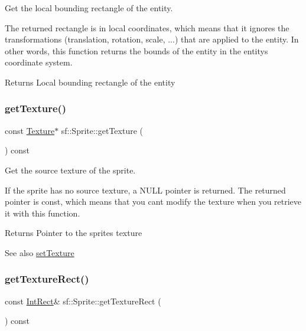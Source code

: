 Get the local bounding rectangle of the entity. 

The returned rectangle is in local coordinates, which means that it ignores the transformations (translation, rotation, scale, ...) that are applied to the entity. In other words, this function returns the bounds of the entity in the entity\textquotesingle{}s coordinate system.

\begin{DoxyReturn}{Returns}
Local bounding rectangle of the entity 
\end{DoxyReturn}
\mbox{\label{classsf_1_1_sprite_a1a76155146c8ff37c4eb5a306b4e9ebe}} 
\subsubsection{\texorpdfstring{get\+Texture()}{getTexture()}}
{\footnotesize\ttfamily const \hyperlink{classsf_1_1_texture}{Texture}$\ast$ sf\+::\+Sprite\+::get\+Texture (\begin{DoxyParamCaption}{ }\end{DoxyParamCaption}) const}



Get the source texture of the sprite. 

If the sprite has no source texture, a N\+U\+LL pointer is returned. The returned pointer is const, which means that you can\textquotesingle{}t modify the texture when you retrieve it with this function.

\begin{DoxyReturn}{Returns}
Pointer to the sprite\textquotesingle{}s texture
\end{DoxyReturn}
\begin{DoxySeeAlso}{See also}
\hyperlink{classsf_1_1_sprite_a3729c88d88ac38c19317c18e87242560}{set\+Texture} 
\end{DoxySeeAlso}
\mbox{\label{classsf_1_1_sprite_a3492896fe7b63f58ae022c5b8bec5c98}} 
\subsubsection{\texorpdfstring{get\+Texture\+Rect()}{getTextureRect()}}
{\footnotesize\ttfamily const \hyperlink{classsf_1_1_rect}{Int\+Rect}\& sf\+::\+Sprite\+::get\+Texture\+Rect (\begin{DoxyParamCaption}{ }\end{DoxyParamCaption}) const}



